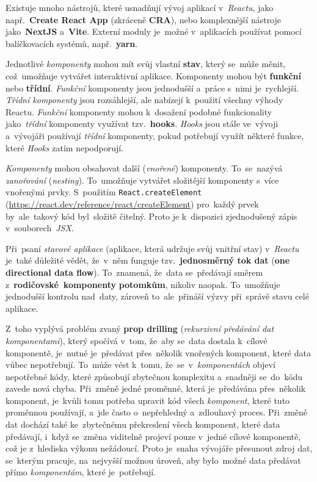 \documentclass[11pt,a4paper]{report}
\begin{document}
            Existuje mnoho nástrojů, které usnadňují vývoj aplikací v~\emph{Reactu}, jako např.~\textbf{Create React App} (zkráceně \textbf{CRA}), nebo komplexnější nástroje jako~\textbf{NextJS} a~\textbf{Vite}. Externí moduly je~možné v~aplikacích používat pomocí balíčkovacích systémů, např.~\textbf{yarn}.

            Jednotlivé \emph{komponenty} mohou mít svůj vlastní \textbf{stav}, který se~může měnit, což~umožňuje vytvářet interaktivní aplikace. Komponenty mohou být \textbf{funkční} nebo \textbf{třídní}. \emph{Funkční} komponenty jsou jednodušší a~práce s~nimi je~rychlejší. \emph{Třídní komponenty} jsou rozsáhlejší, ale nabízejí k~použití všechny výhody Reactu. \emph{Funkční} komponenty mohou k~dosažení podobné funkcionality jako~\emph{třídní} komponenty využívat tzv.~\textbf{hooks}. \emph{Hooks} jsou stále ve~vývoji a~vývojáři používají \emph{třídní} komponenty, pokud potřebují využít některé funkce, které \emph{Hooks} zatím nepodporují.

            \emph{Komponenty} mohou obsahovat další (\emph{vnořené}) komponenty. To~se~nazývá \emph{zanořování} (\emph{nesting}). To~umožňuje vytvářet složitější komponenty s~více vnořenými prvky. S~použitím \texttt{React.createElement} (\url{https://react.dev/reference/react/createElement}) pro~každý prvek by~ale~takový kód byl~složitě čitelný. Proto je k~dispozici zjednodušený zápis v~souborech~\emph{JSX}.

            Při~psaní \emph{stavové aplikace} (aplikace, která udržuje svůj vnitřní stav) v~\emph{Reactu} je~také důležité vědět, že~v~něm funguje tzv.~\textbf{jednosměrný tok dat} (\textbf{one directional data flow}). To~znamená, že~data se~předávají směrem z~\textbf{rodičovské~komponenty} \textbf{potomkům}, nikoliv naopak. To~umožňuje jednodušší kontrolu nad~daty, zároveň to~ale~přináší výzvy při~správě stavu celé aplikace.
            
            Z~toho vyplývá problém zvaný \textbf{prop drilling} (\emph{rekurzivní předávání dat komponentami}), který spočívá v~tom, že~aby se~data dostala k~cílové komponentě, je~nutné je~předávat přes~několik vnořených komponent, které data vůbec nepotřebují. To~může vést k~tomu, že~se~v~\emph{komponentách} objeví nepotřebné kódy, které způsobují zbytečnou komplexitu a~snadněji se~do~kódu zavede nová chyba. Při~změně jedné proměnné, která je~předávána přes~několik komponent, je~kvůli tomu potřeba upravit kód všech \emph{komponent}, které tuto proměnnou používají, a~jde často o~nepřehledný a~zdlouhavý proces. Při~změně dat dochází také ke~zbytečnému překreslení všech komponent, které data předávají, i~když se~změna viditelně projeví pouze v~jedné cílové komponentě, což je z~hlediska výkonu nežádoucí. Proto je~snaha vývojáře přesunout zdroj dat, se~kterým pracuje, na~nejvyšší možnou úroveň, aby bylo~možné data předávat přímo \emph{komponentám}, které je~potřebují.
\end{document}
